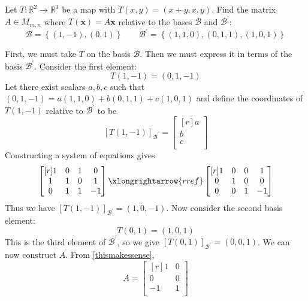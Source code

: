 \begin{exercise}
    Let \(T:\mathbb{R}^2 \to \mathbb{R}^3\) be a map with \(T(x,y)=(x+y,x,y)\). Find the matrix \(A\in M_{m,n}\) where \(T(\mathbf{x})=A \mathbf{x}\) relative to the bases \(\mathcal{B} \) and \(\mathcal{B} ^{\prime} \):
    \[
        \mathcal{B} = \left\{ (1,-1),(0,1) \right\} \qquad \mathcal{B} ^{\prime} = \left\{ (1,1,0),(0,1,1),(1,0,1) \right\} 
    \]
\end{exercise}
\begin{longsolution}
    First, we must take \(T\) on the basis \(\mathcal{B} \). Then we must express it in terms of the basis \(\mathcal{B} ^{\prime} \). Consider the first element:
    \[
        T(1,-1)=(0,1,-1)
    \]
    Let there exist scalars \(a,b,c\) such that \((0,1,-1) = a(1,1,0)+b(0,1,1)+c(1,0,1)\) and define the coordinates of \(T(1,-1)\) relative to \(\mathcal{B} ^{\prime} \) to be 
    \[
        [T(1,-1)]_{\mathcal{B} ^{\prime} }= \begin{bmatrix}[r]
             a \\
             b \\
             c \\
        \end{bmatrix}
    \]
    Constructing a system of equations gives 
    \[
        \begin{bmatrix}[r]
            1 &0  &1  &0   \\
             1&1  &0  &1   \\
             0&1  &1  &-1   \\
        \end{bmatrix}\xlongrightarrow{rref} \begin{bmatrix}[r]
            1 & 0 &0  &1   \\
             0&1  &0  & 0  \\
             0&0  &1  & -1  \\
        \end{bmatrix}
    \]
    Thus we have \([T(1,-1)]_{\mathcal{B} ^{\prime} }=(1,0,-1)\). Now consider the second basis element:
    \[
        T(0,1)=(1,0,1)
    \]
    This is the third element of \(\mathcal{B} ^{\prime} \), so we give \([T(0,1)]_{\mathcal{B} ^{\prime} }=(0,0,1)\). We can now construct \(A\). From \ref{thismakessense},
    \[
        A = \begin{bmatrix}[r]
            1 &0   \\
             0&0   \\
             -1&1   \\
        \end{bmatrix}
    \]
\end{longsolution}
